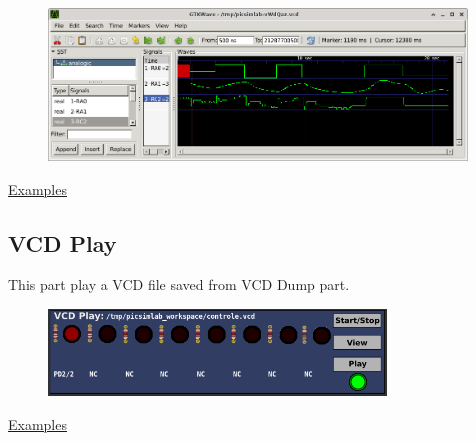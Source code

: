 \begin{figure}[H]
\center
\includegraphics[width=0.99\textwidth]{img/part_vcd_dump_gtkwave_an.png} 
\end{figure}

\href{https://lcgamboa.github.io/picsimlab_examples/Parts.html\#VCD_Dump_(Analogic)}{Examples}

 


\subsection{VCD Play}


This part play a VCD file saved from VCD Dump part.  

\begin{figure}[H]
\center
\includegraphics[width=0.8\textwidth]{img/part_vcd_play.png} 
\end{figure}


\href{https://lcgamboa.github.io/picsimlab_examples/Parts.html\#VCD_Play}{Examples}

